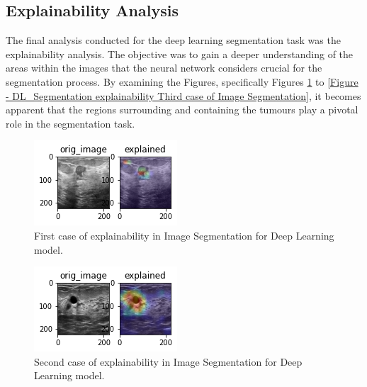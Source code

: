 \subsection{Explainability Analysis}
The final analysis conducted for the deep learning segmentation task was the explainability analysis. The objective was to gain a deeper understanding of the areas within the images that the neural network considers crucial for the segmentation process. By examining the Figures, specifically Figures \ref{Figure - DL_Segmentation explainability First case of Image Segmentation} to \ref{Figure - DL_Segmentation explainability Third case of Image Segmentation}, it becomes apparent that the regions surrounding and containing the tumours play a pivotal role in the segmentation task.
	\begin{figure}
  		\includegraphics[width=\linewidth]{Figures/segment_explained_dl_1.png}
  		\caption{First case of explainability in Image Segmentation for Deep Learning model.}
		\label{Figure - DL_Segmentation explainability First case of Image Segmentation}
  	\end{figure}
  	\begin{figure}
  		\includegraphics[width=\linewidth]{Figures/segment_explained_dl_2.png}
  		\caption{Second case of explainability in Image Segmentation for Deep Learning model.}
		\label{Figure - DL_Segmentation explainability Second case of Image Segmentation}
  	\end{figure}
